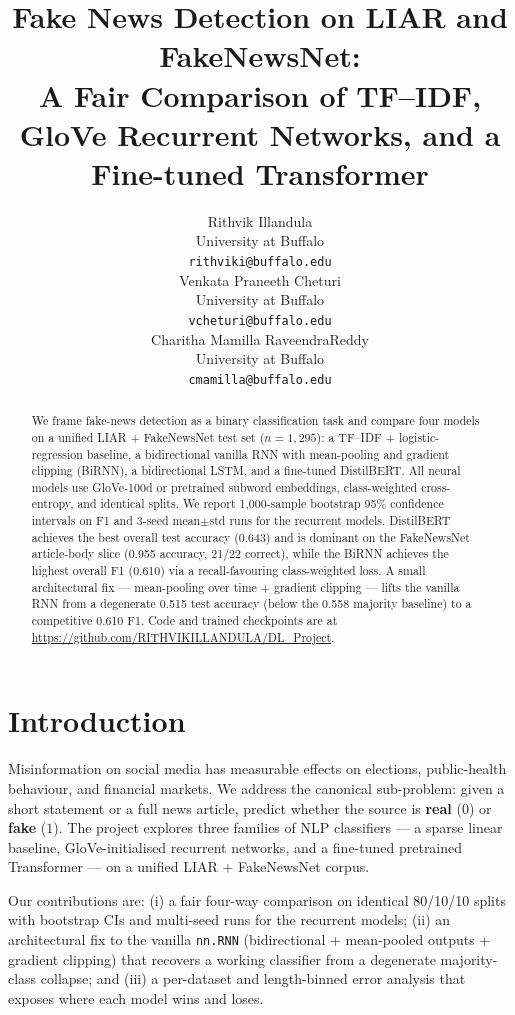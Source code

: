 \documentclass{article}
\title{Fake News Detection on LIAR and FakeNewsNet:\\A Fair Comparison of TF--IDF, GloVe Recurrent Networks, and a Fine-tuned Transformer}
\author{%
  Rithvik Illandula \\
  University at Buffalo\\
  \texttt{rithviki@buffalo.edu} \\
  \And
  Venkata Praneeth Cheturi \\
  University at Buffalo\\
  \texttt{vcheturi@buffalo.edu} \\
  \And
  Charitha Mamilla RaveendraReddy \\
  University at Buffalo\\
  \texttt{cmamilla@buffalo.edu} \\
}
\begin{document}
\maketitle

\begin{abstract}
We frame fake-news detection as a binary classification task and compare four models on a unified LIAR + FakeNewsNet test set ($n=1{,}295$): a TF--IDF + logistic-regression baseline, a bidirectional vanilla RNN with mean-pooling and gradient clipping (BiRNN), a bidirectional LSTM, and a fine-tuned DistilBERT. All neural models use GloVe-100d or pretrained subword embeddings, class-weighted cross-entropy, and identical splits. We report 1{,}000-sample bootstrap 95\% confidence intervals on F1 and 3-seed mean$\pm$std runs for the recurrent models. DistilBERT achieves the best overall test accuracy (0.643) and is dominant on the FakeNewsNet article-body slice (0.955 accuracy, 21/22 correct), while the BiRNN achieves the highest overall F1 (0.610) via a recall-favouring class-weighted loss. A small architectural fix --- mean-pooling over time + gradient clipping --- lifts the vanilla RNN from a degenerate 0.515 test accuracy (below the 0.558 majority baseline) to a competitive 0.610 F1. Code and trained checkpoints are at \url{https://github.com/RITHVIKILLANDULA/DL_Project}.
\end{abstract}

\section{Introduction}

Misinformation on social media has measurable effects on elections, public-health behaviour, and financial markets. We address the canonical sub-problem: given a short statement or a full news article, predict whether the source is \textbf{real} ($0$) or \textbf{fake} ($1$). The project explores three families of NLP classifiers --- a sparse linear baseline, GloVe-initialised recurrent networks, and a fine-tuned pretrained Transformer --- on a unified LIAR + FakeNewsNet corpus.

Our contributions are: (i) a fair four-way comparison on identical 80/10/10 splits with bootstrap CIs and multi-seed runs for the recurrent models; (ii) an architectural fix to the vanilla \texttt{nn.RNN} (bidirectional + mean-pooled outputs + gradient clipping) that recovers a working classifier from a degenerate majority-class collapse; and (iii) a per-dataset and length-binned error analysis that exposes where each model wins and loses.
\end{document}
